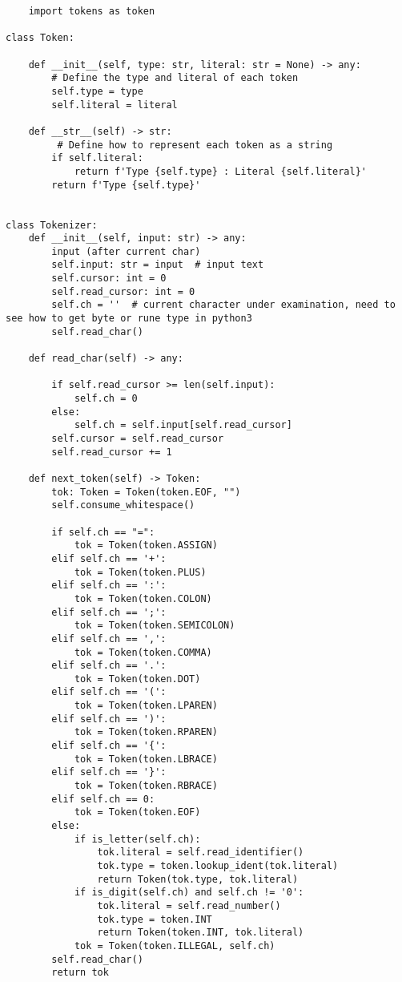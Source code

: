 \begin{lstlisting}
    import tokens as token

class Token:

    def __init__(self, type: str, literal: str = None) -> any:
        # Define the type and literal of each token
        self.type = type
        self.literal = literal

    def __str__(self) -> str:
         # Define how to represent each token as a string
        if self.literal:
            return f'Type {self.type} : Literal {self.literal}'
        return f'Type {self.type}'


class Tokenizer:
    def __init__(self, input: str) -> any:
        input (after current char)
        self.input: str = input  # input text
        self.cursor: int = 0
        self.read_cursor: int = 0
        self.ch = ''  # current character under examination, need to see how to get byte or rune type in python3
        self.read_char()

    def read_char(self) -> any:

        if self.read_cursor >= len(self.input):
            self.ch = 0
        else:
            self.ch = self.input[self.read_cursor]
        self.cursor = self.read_cursor
        self.read_cursor += 1

    def next_token(self) -> Token:
        tok: Token = Token(token.EOF, "")
        self.consume_whitespace()

        if self.ch == "=":
            tok = Token(token.ASSIGN)
        elif self.ch == '+':
            tok = Token(token.PLUS)
        elif self.ch == ':':
            tok = Token(token.COLON)
        elif self.ch == ';':
            tok = Token(token.SEMICOLON)
        elif self.ch == ',':
            tok = Token(token.COMMA)
        elif self.ch == '.':
            tok = Token(token.DOT)
        elif self.ch == '(':
            tok = Token(token.LPAREN)
        elif self.ch == ')':
            tok = Token(token.RPAREN)
        elif self.ch == '{':
            tok = Token(token.LBRACE)
        elif self.ch == '}':
            tok = Token(token.RBRACE)
        elif self.ch == 0:
            tok = Token(token.EOF)
        else:
            if is_letter(self.ch):
                tok.literal = self.read_identifier()
                tok.type = token.lookup_ident(tok.literal)
                return Token(tok.type, tok.literal)
            if is_digit(self.ch) and self.ch != '0':
                tok.literal = self.read_number()
                tok.type = token.INT
                return Token(token.INT, tok.literal)
            tok = Token(token.ILLEGAL, self.ch)
        self.read_char()
        return tok


\end{lstlisting}
